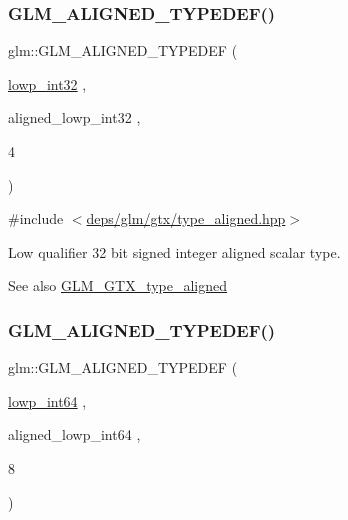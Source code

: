 \subsubsection{\texorpdfstring{G\+L\+M\+\_\+\+A\+L\+I\+G\+N\+E\+D\+\_\+\+T\+Y\+P\+E\+D\+E\+F()}{GLM\_ALIGNED\_TYPEDEF()}\hspace{0.1cm}{\footnotesize\ttfamily [3/209]}}
{\footnotesize\ttfamily glm\+::\+G\+L\+M\+\_\+\+A\+L\+I\+G\+N\+E\+D\+\_\+\+T\+Y\+P\+E\+D\+EF (\begin{DoxyParamCaption}\item[{\hyperlink{group__gtc__type__precision_gad9939c9d6fec1c6accc02a83c6500f08}{lowp\+\_\+int32}}]{,  }\item[{aligned\+\_\+lowp\+\_\+int32}]{,  }\item[{4}]{ }\end{DoxyParamCaption})}



{\ttfamily \#include $<$\hyperlink{gtx_2type__aligned_8hpp}{deps/glm/gtx/type\+\_\+aligned.\+hpp}$>$}

Low qualifier 32 bit signed integer aligned scalar type. \begin{DoxySeeAlso}{See also}
\hyperlink{group__gtx__type__aligned}{G\+L\+M\+\_\+\+G\+T\+X\+\_\+type\+\_\+aligned} 
\end{DoxySeeAlso}
\mbox{\label{group__gtx__type__aligned_ga6612eb77c8607048e7552279a11eeb5f}} 
\subsubsection{\texorpdfstring{G\+L\+M\+\_\+\+A\+L\+I\+G\+N\+E\+D\+\_\+\+T\+Y\+P\+E\+D\+E\+F()}{GLM\_ALIGNED\_TYPEDEF()}\hspace{0.1cm}{\footnotesize\ttfamily [4/209]}}
{\footnotesize\ttfamily glm\+::\+G\+L\+M\+\_\+\+A\+L\+I\+G\+N\+E\+D\+\_\+\+T\+Y\+P\+E\+D\+EF (\begin{DoxyParamCaption}\item[{\hyperlink{group__gtc__type__precision_gab8a8e75af347592406e41b3ae2c0712b}{lowp\+\_\+int64}}]{,  }\item[{aligned\+\_\+lowp\+\_\+int64}]{,  }\item[{8}]{ }\end{DoxyParamCaption})}



